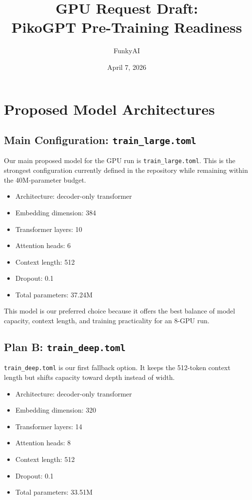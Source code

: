 \documentclass[11pt]{article}
\title{GPU Request Draft:\\PikoGPT Pre-Training Readiness}
\author{FunkyAI}
\date{April 7, 2026}
\begin{document}
\maketitle

\section*{Proposed Model Architectures}

\subsection*{Main Configuration: \texttt{train\_large.toml}}
Our main proposed model for the GPU run is \texttt{train\_large.toml}. This is the strongest configuration currently defined in the repository while remaining within the 40M-parameter budget.

\begin{itemize}[leftmargin=1.5em]
  \item Architecture: decoder-only transformer
  \item Embedding dimension: 384
  \item Transformer layers: 10
  \item Attention heads: 6
  \item Context length: 512
  \item Dropout: 0.1
  \item Total parameters: 37.24M
\end{itemize}

This model is our preferred choice because it offers the best balance of model capacity, context length, and training practicality for an 8-GPU run.

\subsection*{Plan B: \texttt{train\_deep.toml}}
\texttt{train\_deep.toml} is our first fallback option. It keeps the 512-token context length but shifts capacity toward depth instead of width.

\begin{itemize}[leftmargin=1.5em]
  \item Architecture: decoder-only transformer
  \item Embedding dimension: 320
  \item Transformer layers: 14
  \item Attention heads: 8
  \item Context length: 512
  \item Dropout: 0.1
  \item Total parameters: 33.51M
\end{itemize}
\end{document}
